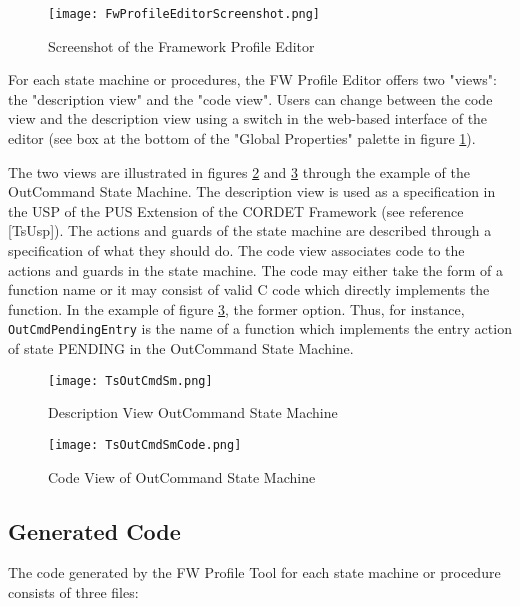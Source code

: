 \documentclass{pnp_article}
\begin{document}
\begin{figure}[htbp]
 \centering
 \texttt{[image: FwProfileEditorScreenshot.png]}
 \caption{Screenshot of the Framework Profile Editor}
 \label{fig:FwProfileEditorScreenshot}
\end{figure}

For each state machine or procedures, the FW Profile Editor offers two "views": the "description view" and the "code view". Users can change between the code view and the description view using a switch in the web-based interface of the editor (see box at the bottom of the "Global Properties" palette in figure \ref{fig:FwProfileEditorScreenshot}).

The two views are illustrated in figures \ref{fig:TsOutCmdSm} and \ref{fig:TsOutCmdSmCode} through the example of the OutCommand State Machine. The description view is used as a specification in the USP of the PUS Extension of the CORDET Framework (see reference [TsUsp]). The actions and guards of the state machine are described through a specification of what they should do. The code view associates code to the actions and guards in the state machine. The code may either take the form of a function name or it may consist of valid C code which directly implements the function. In the example of figure \ref{fig:TsOutCmdSmCode}, the former option. Thus, for instance, \texttt{OutCmdPendingEntry} is the name of a function which implements the entry action of state PENDING in the OutCommand State Machine.


\begin{figure}[H]
 \centering
 \texttt{[image: TsOutCmdSm.png]}
 \caption{Description View OutCommand State Machine}
 \label{fig:TsOutCmdSm}
\end{figure}


\begin{figure}[H]
 \centering
 \texttt{[image: TsOutCmdSmCode.png]}
 \caption{Code View of OutCommand State Machine}
 \label{fig:TsOutCmdSmCode}
\end{figure}

\subsection{Generated Code}
The code generated by the FW Profile Tool for each state machine or procedure consists of three files:
\end{document}
